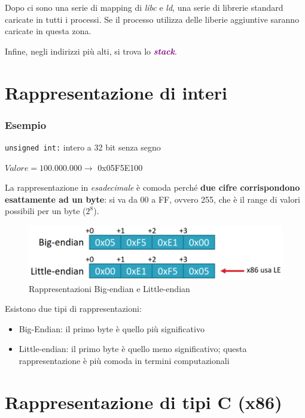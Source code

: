 Dopo ci sono una serie di mapping di \textit{libc} e \textit{ld}, una serie di librerie standard
caricate in tutti i processi. Se il processo utilizza delle liberie aggiuntive saranno caricate in questa zona.

Infine, negli indirizzi più alti, si trova lo \textcolor{purple}{\textbf{\textit{stack}}}.

\section{Rappresentazione di interi}

\subsubsection{Esempio}

\texttt{unsigned int:} intero a 32 bit senza segno 

$Valore = 100.000.000 \rightarrow$ 0x05F5E100

La rappresentazione in \textit{esadecimale} è comoda perché \textbf{due cifre corrispondono esattamente
ad un byte}: si va da 00 a FF, ovvero 255, che è il range di valori possibili per un byte ($2^8$).

\begin{figure}[ht]
    \centering
    \includegraphics[width=0.75\linewidth]{images/rappr-interi.png}
    \caption{Rappresentazioni Big-endian e Little-endian}
\end{figure}

\newpage
Esistono due tipi di rappresentazioni:
\begin{itemize}
    \item Big-Endian: il primo byte è quello più significativo
    \item Little-endian: il primo byte è quello meno significativo; questa rappresentazione
    è più comoda in termini computazionali
\end{itemize}

\section{Rappresentazione di tipi C (x86)}

